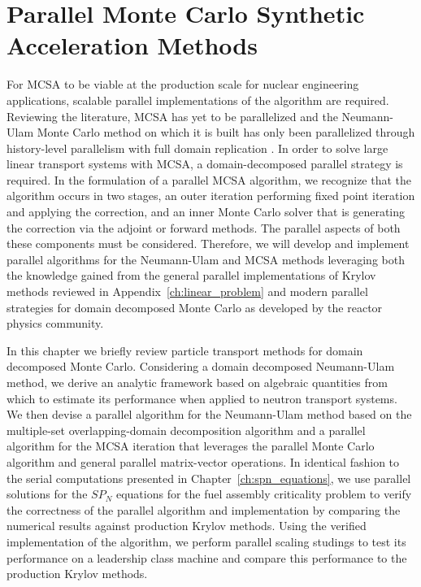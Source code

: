 \chapter{Parallel Monte Carlo Synthetic \\ Acceleration Methods\ }
\label{ch:parallel_methods}
For MCSA to be viable at the production scale for nuclear engineering
applications, scalable parallel implementations of the algorithm are
required. Reviewing the literature, MCSA has yet to be parallelized
and the Neumann-Ulam Monte Carlo method on which it is built has only
been parallelized through history-level parallelism with full domain
replication \citep{alexandrov_efficient_1998}. In order to solve large
linear transport systems with MCSA, a domain-decomposed parallel
strategy is required. In the formulation of a parallel MCSA algorithm,
we recognize that the algorithm occurs in two stages, an outer
iteration performing fixed point iteration and applying the
correction, and an inner Monte Carlo solver that is generating the
correction via the adjoint or forward methods. The parallel aspects of
both these components must be considered. Therefore, we will develop
and implement parallel algorithms for the Neumann-Ulam and MCSA
methods leveraging both the knowledge gained from the general parallel
implementations of Krylov methods reviewed in
Appendix~\ref{ch:linear_problem} and modern parallel strategies for
domain decomposed Monte Carlo as developed by the reactor physics
community.

In this chapter we briefly review particle transport methods for
domain decomposed Monte Carlo. Considering a domain decomposed
Neumann-Ulam method, we derive an analytic framework based on
algebraic quantities from which to estimate its performance when
applied to neutron transport systems. We then devise a parallel
algorithm for the Neumann-Ulam method based on the multiple-set
overlapping-domain decomposition algorithm and a parallel algorithm
for the MCSA iteration that leverages the parallel Monte Carlo
algorithm and general parallel matrix-vector operations. In identical
fashion to the serial computations presented in
Chapter~\ref{ch:spn_equations}, we use parallel solutions for the
$SP_N$ equations for the fuel assembly criticality problem to verify
the correctness of the parallel algorithm and implementation by
comparing the numerical results against production Krylov
methods. Using the verified implementation of the algorithm, we
perform parallel scaling studings to test its performance on a
leadership class machine and compare this performance to the
production Krylov methods.

